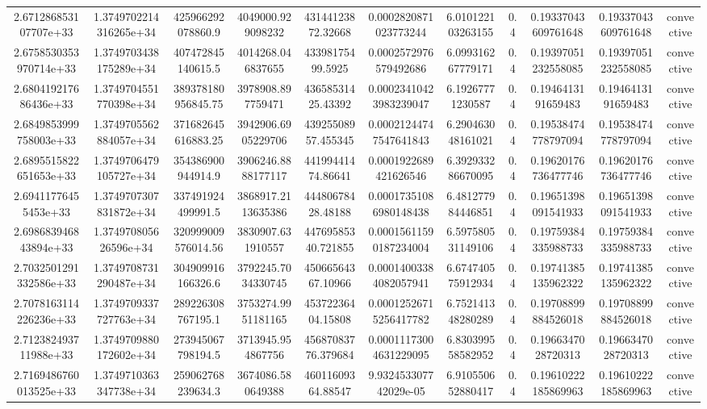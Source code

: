 \begin{table}
\begin{tabular}{ccccccccccc}
2.671286853107707e+33 & 1.3749702214316265e+34 & 425966292078860.9 & 4049000.929098232 & 43144123872.32668 & 0.0002820871023773244 & 6.010122103263155 & 0.4 & 0.19337043609761648 & 0.19337043609761648 & convective \\
2.6758530353970714e+33 & 1.3749703438175289e+34 & 407472845140615.5 & 4014268.046837655 & 43398175499.5925 & 0.0002572976579492686 & 6.099316267779171 & 0.4 & 0.19397051232558085 & 0.19397051232558085 & convective \\
2.680419217686436e+33 & 1.3749704551770398e+34 & 389378180956845.75 & 3978908.897759471 & 43658531425.43392 & 0.00023410423983239047 & 6.19267771230587 & 0.4 & 0.1946413191659483 & 0.1946413191659483 & convective \\
2.6849853999758003e+33 & 1.3749705562884057e+34 & 371682645616883.25 & 3942906.6905229706 & 43925508957.455345 & 0.00021244747547641843 & 6.290463048161021 & 0.4 & 0.19538474778797094 & 0.19538474778797094 & convective \\
2.6895515822651653e+33 & 1.3749706479105727e+34 & 354386900944914.9 & 3906246.8888177117 & 44199441474.86641 & 0.0001922689421626546 & 6.392933286670095 & 0.4 & 0.19620176736477746 & 0.19620176736477746 & convective \\
2.69411776455453e+33 & 1.3749707307831872e+34 & 337491924499991.5 & 3868917.2113635386 & 44480678428.48188 & 0.00017351086980148438 & 6.481277984446851 & 0.4 & 0.19651398091541933 & 0.19651398091541933 & convective \\
2.698683946843894e+33 & 1.374970805626596e+34 & 320999009576014.56 & 3830907.631910557 & 44769585340.721855 & 0.00015611590187234004 & 6.597580531149106 & 0.4 & 0.19759384335988733 & 0.19759384335988733 & convective \\
2.7032501291332586e+33 & 1.3749708731290487e+34 & 304909916166326.6 & 3792245.7034330745 & 45066564367.10966 & 0.00014003384082057941 & 6.674740575912934 & 0.4 & 0.19741385135962322 & 0.19741385135962322 & convective \\
2.7078163114226236e+33 & 1.3749709337727763e+34 & 289226308767195.1 & 3753274.9951181165 & 45372236404.15808 & 0.00012526715256417782 & 6.752141348280289 & 0.4 & 0.19708899884526018 & 0.19708899884526018 & convective \\
2.712382493711988e+33 & 1.3749709880172602e+34 & 273945067798194.5 & 3713945.954867756 & 45687083776.379684 & 0.00011173004631229095 & 6.830399558582952 & 0.4 & 0.1966347028720313 & 0.1966347028720313 & convective \\
2.7169486760013525e+33 & 1.3749710363347738e+34 & 259062768239634.3 & 3674086.580649388 & 46011609364.88547 & 9.932453307742029e-05 & 6.910550652880417 & 0.4 & 0.19610222185869963 & 0.19610222185869963 & convective \\

\end{tabular}
\end{table}

